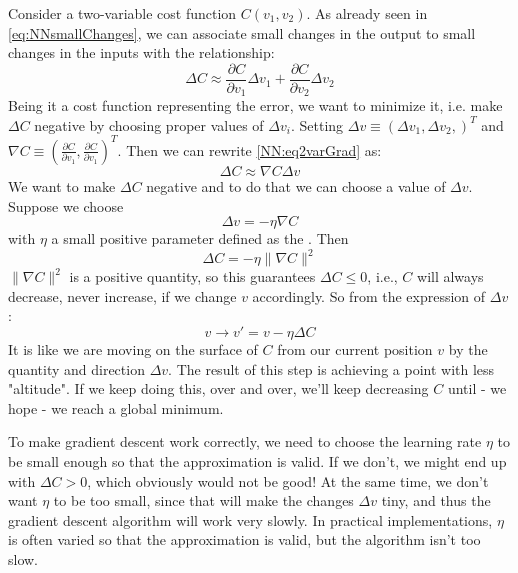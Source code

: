 Consider a two-variable cost function $C(v_1, v_2)$. As already seen in \autoref{eq:NNsmallChanges}, we can associate small changes in the output to small changes in the inputs with the relationship:
\begin{equation}
\Delta C \approx \frac{\partial C}{\partial v_1} \Delta v_1 +\frac{\partial C}{\partial v_2} \Delta v_2
\label{NN:eq2varGrad}
\end{equation}
Being it a cost function representing the error, we want to minimize it, i.e. make $\Delta C$ negative by choosing proper values of $\Delta v_i$. Setting $\Delta v \equiv \left( \Delta v_1, \Delta v_2, \right)^T$ and $\nabla C \equiv \left( \frac{\partial C}{\partial v_1}, \frac{\partial C}{\partial v_1}\right)^T$. Then we can rewrite \autoref{NN:eq2varGrad} as:
\begin{equation}
\Delta C \approx \nabla C \Delta v
\end{equation}
We want to make $\Delta C$ negative and to do that we can choose a value of $\Delta v$. Suppose we choose
\begin{equation}
\Delta v = -\eta \nabla C
\end{equation}
with $\eta$ a small positive parameter defined as the . Then
\begin{equation}
\Delta C = -\eta \| \nabla C \|^2
\end{equation}
$ \| \nabla C \|^2$ is a positive quantity, so this guarantees $\Delta C \le 0$, i.e., $C$ will always decrease, never increase, if we change $v$ accordingly. So from the expression of $\Delta v$:
\begin{equation}
v \rightarrow v' = v -\eta \Delta C
\end{equation}
It is like we are moving on the surface of $C$ from our current position $v$ by the quantity and direction $\Delta v$. The result of this step is achieving a point with less "altitude". If we keep doing this, over and over, we'll keep decreasing $C$ until - we hope - we reach a global minimum.

To make gradient descent work correctly, we need to choose the learning rate $\eta$ to be small enough so that the approximation is valid. If we don't, we might end up with $\Delta C > 0$, which obviously would not be good! At the same time, we don't want $\eta$ to be too small, since that will make the changes $\Delta v$ tiny, and thus the gradient descent algorithm will work very slowly. In practical implementations, $\eta$ is often varied so that the approximation is valid, but the algorithm isn't too slow. 

